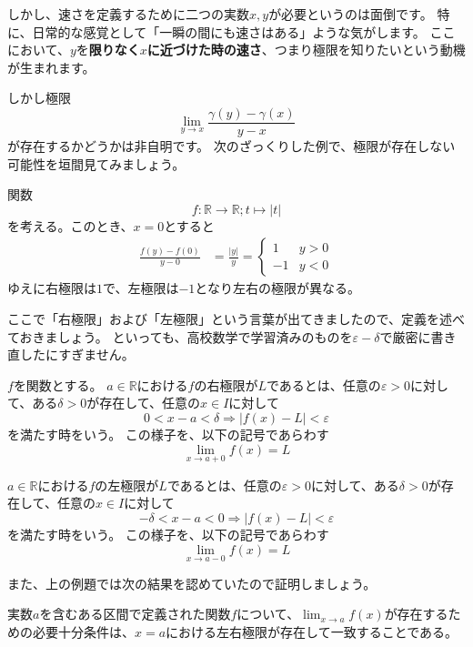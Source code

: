 しかし、速さを定義するために二つの実数$x,y$が必要というのは面倒です。
特に、日常的な感覚として「一瞬の間にも速さはある」ような気がします。
ここにおいて、$y$を\textbf{限りなく$x$に近づけた時の速さ}、つまり極限を知りたいという動機が生まれます。

しかし極限
\[
  \lim_{y\to x}\frac{\gamma(y)-\gamma(x)}{y-x}
\]
が存在するかどうかは非自明です。
次のざっくりした例で、極限が存在しない可能性を垣間見てみましょう。

\begin{example}
  関数
  \[
    f:\mathbb{R}\to\mathbb{R};t\mapsto|t|
  \]
  を考える。このとき、$x=0$とすると
  \begin{align*}
    \frac{f(y)-f(0)}{y-0}&=\frac{|y|}{y}=\begin{cases}
      1 & y>0\\
      -1 & y<0
    \end{cases}
  \end{align*}
  ゆえに右極限は$1$で、左極限は$-1$となり左右の極限が異なる。
\end{example}
ここで「右極限」および「左極限」という言葉が出てきましたので、定義を述べておきましょう。
といっても、高校数学で学習済みのものを$\varepsilon-\delta$で厳密に書き直したにすぎません。
\begin{definition}
  $f$を関数とする。
  $a\in\mathbb{R}$における$f$の右極限が$L$であるとは、任意の$\varepsilon>0$に対して、ある$\delta>0$が存在して、任意の$x\in I$に対して
  \[0<x-a<\delta\Rightarrow|f(x)-L|<\varepsilon\]
  を満たす時をいう。
  この様子を、以下の記号であらわす
  \[
    \lim_{x\to a+0}f(x)=L
  \]

  $a\in\mathbb{R}$における$f$の左極限が$L$であるとは、任意の$\varepsilon>0$に対して、ある$\delta>0$が存在して、任意の$x\in I$に対して
  \[-\delta<x-a<0\Rightarrow|f(x)-L|<\varepsilon\]
  を満たす時をいう。
  この様子を、以下の記号であらわす
  \[
    \lim_{x\to a-0}f(x)=L
  \]
\end{definition}
また、上の例題では次の結果を認めていたので証明しましょう。
\begin{theorem}\label{theorem:exists-limit-iff-exists-and-equal-left/right-limits}
  実数$a$を含むある区間で定義された関数$f$について、$\lim_{x\to a}f(x)$が存在するための必要十分条件は、$x=a$における左右極限が存在して一致することである。
\end{theorem}

